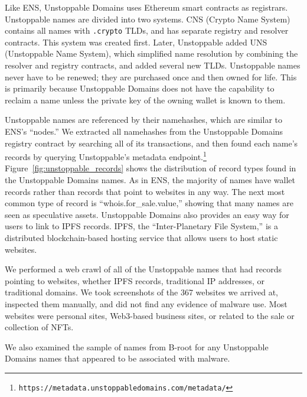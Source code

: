 
Like ENS, Unstoppable Domains uses Ethereum smart contracts as 
registrars. Unstoppable names are divided into two systems. CNS 
(Crypto Name System) contains all names with \texttt{.crypto} 
TLDs, and has separate registry and resolver contracts. This 
system was created first. Later, Unstoppable added UNS 
(Unstoppable Name System), which simplified name resolution by 
combining the resolver and registry contracts, and added several 
new TLDs. Unstoppable names never have to be renewed; they are 
purchased once and then owned for life. This is primarily 
because Unstoppable Domains does not have the capability to 
reclaim a name unless the private key of the owning wallet is 
known to them. 

Unstoppable names are referenced by their namehashes, which are 
similar to ENS's ``nodes.'' We extracted all namehashes from the 
Unstoppable Domains registry contract by searching all of its 
transactions, and then found each name's records by querying 
Unstoppable's metadata endpoint.\footnote{
	\texttt{https://metadata.unstoppabledomains.com/metadata/}} 
Figure~\ref{fig:unstoppable_records} shows the 
distribution 
of record types found in the Unstoppable Domains names. As in 
ENS, the majority of names have wallet records rather than 
records that point to websites in any way. The next most common 
type of record is ``whois.for\_sale.value,'' showing that many 
names are seen as speculative assets. Unstoppable Domains also 
provides an easy way for users to link to IPFS records. IPFS, 
the ``Inter-Planetary File System,'' is a distributed 
blockchain-based hosting service that allows users to host 
static websites.

We performed a web crawl of all of the Unstoppable names that 
had records pointing to websites, whether IPFS records, 
traditional IP addresses, or traditional domains. We took 
screenshots of the 367 websites we arrived 
at, inspected them manually, and did not find any evidence of 
malware use. Most 
websites were personal sites, Web3-based business sites, or related to the sale 
or collection of NFTs. 

We also examined the sample of names from B-root for any Unstoppable Domains 
names that appeared to be associated with malware. 

